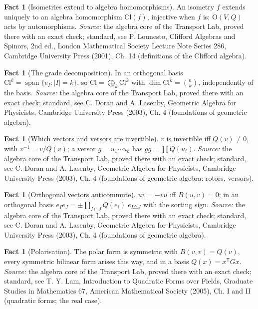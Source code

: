 \documentclass[11pt]{article}
\theoremstyle{definition}
\newtheorem{fact}[theorem]{Fact}
\theoremstyle{plain}
\providecommand{\Cl}{}\renewcommand{\Cl}{\mathrm{Cl}}
\begin{document}
\begin{fact}[Isometries extend to algebra homomorphisms]\label{c:std-algebra.functoriality}
An isometry $f$ extends uniquely to an algebra homomorphism $\Cl(f)$, injective when $f$ is; $\mathrm{O}(V, Q)$ acts by automorphisms.
\emph{Source:} the algebra core of the Transport Lab, proved there with an exact check; standard, see P. Lounesto, Clifford Algebras and Spinors, 2nd ed., London Mathematical Society Lecture Note Series 286, Cambridge University Press (2001), Ch. 14 (definitions of the Clifford algebra).
\end{fact}

\begin{fact}[The grade decomposition]\label{c:std-algebra.grade-decomposition}
In an orthogonal basis $\Cl^{k} = \operatorname{span}\{e_I : |I| = k\}$, so $\Cl = \bigoplus_k \Cl^{k}$ with $\dim \Cl^{k} = \binom{n}{k}$, independently of the basis.
\emph{Source:} the algebra core of the Transport Lab, proved there with an exact check; standard, see C. Doran and A. Lasenby, Geometric Algebra for Physicists, Cambridge University Press (2003), Ch. 4 (foundations of geometric algebra).
\end{fact}

\begin{fact}[Which vectors and versors are invertible]\label{c:std-algebra.inverse-of-vector}
$v$ is invertible iff $Q(v) \ne 0$, with $v^{-1} = v/Q(v)$; a versor $g = u_1 \cdots u_k$ has $g\tilde{g} = \prod Q(u_i)$.
\emph{Source:} the algebra core of the Transport Lab, proved there with an exact check; standard, see C. Doran and A. Lasenby, Geometric Algebra for Physicists, Cambridge University Press (2003), Ch. 4 (foundations of geometric algebra: rotors, versors).
\end{fact}

\begin{fact}[Orthogonal vectors anticommute]\label{c:std-algebra.orthogonal-anticommute}
$uv = -vu$ iff $B(u,v) = 0$; in an orthogonal basis $e_I e_J = \pm \prod_{I \cap J} Q(e_i)\; e_{I \triangle J}$ with the sorting sign.
\emph{Source:} the algebra core of the Transport Lab, proved there with an exact check; standard, see C. Doran and A. Lasenby, Geometric Algebra for Physicists, Cambridge University Press (2003), Ch. 4 (foundations of geometric algebra).
\end{fact}

\begin{fact}[Polarisation]\label{c:std-algebra.polarisation}
The polar form is symmetric with $B(v,v) = Q(v)$, every symmetric bilinear form arises this way, and in a basis $Q(x) = x^{\mathsf T} G x$.
\emph{Source:} the algebra core of the Transport Lab, proved there with an exact check; standard, see T. Y. Lam, Introduction to Quadratic Forms over Fields, Graduate Studies in Mathematics 67, American Mathematical Society (2005), Ch. I and II (quadratic forms; the real case).
\end{fact}
\end{document}
